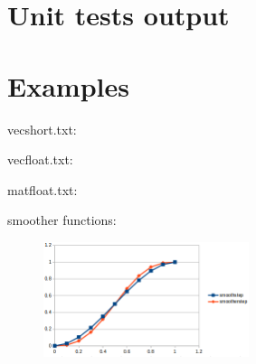 \section{Unit tests output}

\begin{scriptsize}
\begin{ttfamily}

\end{ttfamily}
\end{scriptsize}

\section{Examples}

vecshort.txt:\\
\begin{scriptsize}
\begin{ttfamily}

\end{ttfamily}
\end{scriptsize}

vecfloat.txt:\\
\begin{scriptsize}
\begin{ttfamily}

\end{ttfamily}
\end{scriptsize}

matfloat.txt:\\
\begin{scriptsize}
\begin{ttfamily}

\end{ttfamily}
\end{scriptsize}

smoother functions:\\
\begin{center}
\begin{figure}[H]
\centering\includegraphics[width=6cm]{./smoother.png}\\
\end{figure}
\end{center}

